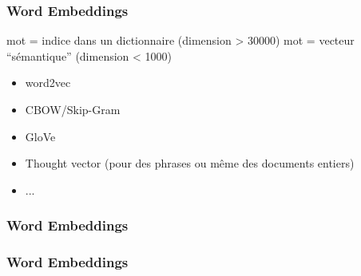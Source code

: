 \begin{frame}
  \frametitle{Word Embeddings} 
  mot = indice dans un dictionnaire (dimension > 30000)
  \newline
  mot = vecteur ``sémantique'' (dimension < 1000) 
  \begin{itemize}
  \item word2vec
  \item CBOW/Skip-Gram
  \item GloVe
  \item Thought vector (pour des phrases ou même des documents entiers)
  \item ...
  \end{itemize}
\end{frame}

\begin{frame}
  \frametitle{Word Embeddings} 
\end{frame}

\begin{frame}
  \frametitle{Word Embeddings} 
  \begin{center}
     \\
  \end{center}
\end{frame}


